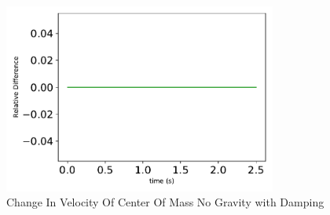 \begin{figure}[htbp]\centerline{\includegraphics[width=0.8\textwidth]{AutoTeX/ChangeInVelocityOfCenterOfMassNoGravityDamping}}\caption{Change In Velocity Of Center Of Mass No Gravity with Damping}\label{fig:ChangeInVelocityOfCenterOfMassNoGravityDamping}\end{figure}